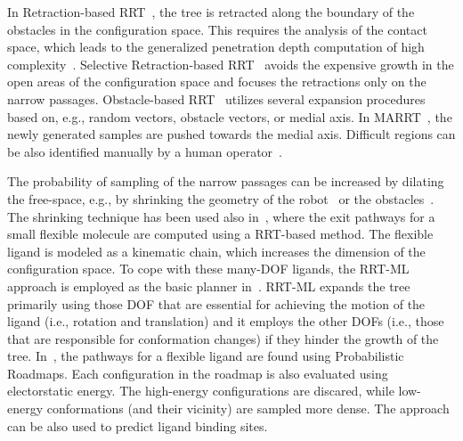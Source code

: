 \documentclass[usletter, 10pt, conference]{ieeeconf} %
\def\qrand{q_{rand}}
\def\qnear{q_{near}}
\begin{document}
{%

In Retraction-based RRT~\cite{zhangRetraction}, the tree is retracted along the boundary of the obstacles in the configuration space.
This requires the analysis of the contact space, which leads to the generalized penetration depth computation of high complexity~\cite{he2016efficient}. %
Selective Retraction-based RRT~\cite{lee2012srrrt} avoids the expensive growth in the open areas of the configuration space and focuses 
the retractions only on the narrow passages.
Obstacle-based RRT~\cite{amatoOBRRT} utilizes several expansion procedures based on, e.g., random vectors, obstacle vectors, or medial axis.
In MARRT~\cite{denny2014marrt}, the newly generated samples are pushed towards the medial axis.
Difficult regions can be also identified manually by a human operator~\cite{denny2018general}. 

The probability of sampling of the narrow passages can be increased by dilating the free-space, e.g., by shrinking the geometry of 
the robot~\cite{hsuOnProb} or the obstacles~\cite{bayazitIRC}.
The shrinking technique has been used also in~\cite{cortes2010simulating}, where the exit pathways for a small flexible molecule are
computed using a RRT-based method.
The flexible ligand is modeled as a kinematic chain, which increases the dimension of the configuration space.
To cope with these many-DOF ligands, the RRT-ML~\cite{cortes2007mlrrt} approach is employed as the basic planner in~\cite{cortes2010simulating}.
RRT-ML expands the tree primarily using those DOF that are essential for achieving the motion of the ligand (i.e., rotation
and translation) and it employs the other DOFs (i.e., those that are responsible for conformation changes) if they hinder the growth of the tree.
In~\cite{singhLIG}, the pathways for a flexible ligand are found using Probabilistic Roadmaps.
Each configuration in the roadmap is also evaluated using electorstatic energy.
The high-energy configurations are discared, while low-energy conformations (and their vicinity) are sampled more dense.
The approach~\cite{singhLIG} can be also used to predict ligand binding sites.

}
\end{document}
